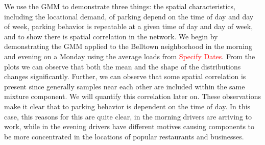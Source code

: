 \documentclass{article}
\begin{document}
We use the GMM to demonstrate three things: the spatial characteristics, including the locational demand, of parking depend on the time of day and day of week, parking behavior is repeatable at a given time of day and day of week, and to show there is spatial correlation in the network.
\newline
\indent
We begin by demonstrating the GMM applied to the Belltown neighborhood in the morning and evening on a Monday using the average loads from \textcolor{red}{Specify Dates}. From the plots we can observe that both the mean and the shape of the distributions changes significantly. Further, we can observe that some spatial correlation is present since generally samples near each other are included within the same mixture component. We will quantify this correlation later on. These observations make it clear that to parking behavior is dependent on the time of day. In this case, this reasons for this are quite clear, in the morning drivers are arriving to work, while in the evening drivers have different motives causing components to be more concentrated in the locations of popular restaurants and businesses.
\end{document}
